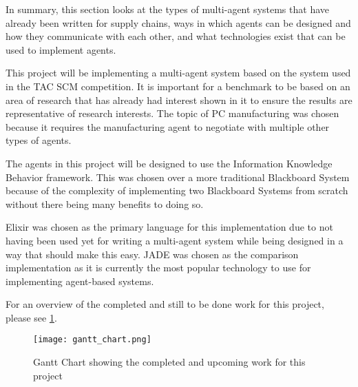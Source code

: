 In summary, this section looks at the types of multi-agent systems that have already been written for supply chains, ways in which agents can be designed and how they communicate with each other, and what technologies exist that can be used to implement agents.

This project will be implementing a multi-agent system based on the system used in the TAC SCM competition.
It is important for a benchmark to be based on an area of research that has already had interest shown in it to ensure the results are representative of research interests.
The topic of PC manufacturing was chosen because it requires the manufacturing agent to negotiate with multiple other types of agents.

The agents in this project will be designed to use the Information Knowledge Behavior framework.
This was chosen over a more traditional Blackboard System because of the complexity of implementing two Blackboard Systems from scratch without there being many benefits to doing so.

Elixir was chosen as the primary language for this implementation due to not having been used yet for writing a multi-agent system while being designed in a way that should make this easy.
JADE was chosen as the comparison implementation as it is currently the most popular technology to use for implementing agent-based systems.


For an overview of the completed and still to be done work for this project, please see \cref{fig:gantt_chart}.

\begin{figure}[ht]
    \centering
    \texttt{[image: gantt\_chart.png]}
    \caption{Gantt Chart showing the completed and upcoming work for this project}\label{fig:gantt_chart}
\end{figure}
